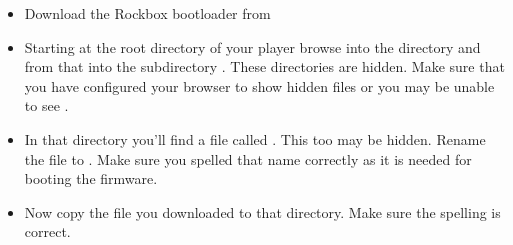 
\begin{itemize}
\item Download the Rockbox bootloader from
\item Starting at the root directory of your player browse into the directory
   and from that into the subdirectory .
  These directories are hidden. Make sure that you have configured your browser
  to show hidden files or you may be unable to see .
\item In that directory you'll find a file called . This too
  may be hidden. Rename the file to . Make sure you
  spelled that name  correctly as it is needed for booting the \playerman{} firmware.
\item Now copy the file  you downloaded to that directory.
  Make sure the spelling is correct.
\end{itemize}

